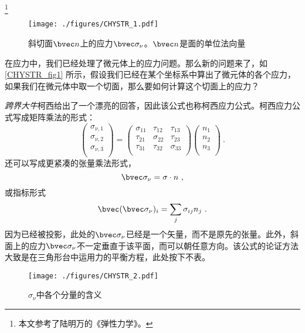 
\footnote{本文参考了陆明万的《弹性力学》。}

\begin{figure}[ht]
\centering
\texttt{[image: ./figures/CHYSTR\_1.pdf]}
\caption{斜切面$\bvec n$上的应力$\bvec \sigma_\nu$。$\bvec n$是面的单位法向量} \label{CHYSTR_fig1}
\end{figure}

在应力中，我们已经处理了微元体上的应力问题。那么新的问题来了，如\autoref{CHYSTR_fig1} 所示，假设我们已经在某个坐标系中算出了微元体的各个应力，如果我们在微元体中取一个切面，那么要如何计算这个切面上的应力？

\textsl{跨界大牛}柯西给出了一个漂亮的回答，因此该公式也称柯西应力公式。柯西应力公式写成矩阵乘法的形式：
\begin{equation}\label{CHYSTR_eq1}
\begin{pmatrix}
\sigma_{\nu,1}\\
\sigma_{\nu,2}\\
\sigma_{\nu,3}\\
\end{pmatrix}
=
\begin{pmatrix}
\sigma_{11} & \tau_{12} & \tau_{13} \\
\tau_{21} & \sigma_{22} & \tau_{23} \\
\tau_{31} & \tau_{32} & \sigma_{33} \\
\end{pmatrix}
\begin{pmatrix}
n_1\\
n_2\\
n_3\\
\end{pmatrix}~.
\end{equation}
还可以写成更紧凑的张量乘法形式，
\begin{equation}
\bvec \sigma_\nu = \sigma \cdot n ~,
\end{equation}
或指标形式
\begin{equation}
\bvec (\bvec \sigma_\nu)_i = \sum_j \sigma_{ij} n_j~.
\end{equation}
因为已经被投影，此处的$\bvec \sigma_\nu$已经是一个矢量，而不是原先的张量。此外，斜面上的应力$\bvec \sigma_\nu$不一定垂直于该平面，而可以朝任意方向。该公式的论证方法大致是在三角形台中运用力的平衡方程，此处按下不表。

\begin{figure}[ht]
\centering
\texttt{[image: ./figures/CHYSTR\_2.pdf]}
\caption{$\sigma_\nu$中各个分量的含义} \label{CHYSTR_fig2}
\end{figure}

